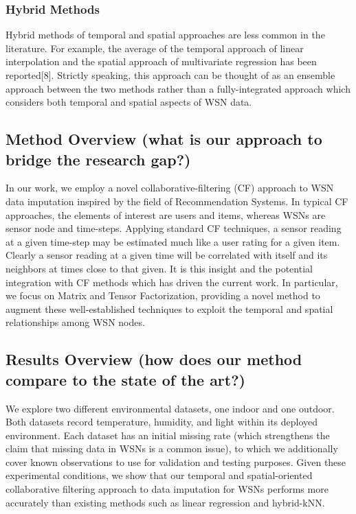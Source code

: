 \subsubsection{Hybrid Methods}
Hybrid methods of temporal and spatial approaches are less common in the literature.
For example, the average of the temporal approach of linear interpolation and the spatial approach of multivariate regression has been reported[8].
Strictly speaking, this approach can be thought of as an ensemble approach between the two methods rather than a fully-integrated approach which considers both temporal and spatial aspects of WSN data.


\subsection{Method Overview (what is our approach to bridge the research gap?)}
In our work, we employ a novel collaborative-filtering (CF) approach to WSN data imputation inspired by the field of Recommendation Systems.
In typical CF approaches, the elements of interest are users and items, whereas WSNs are sensor node and time-steps.
Applying standard CF techniques, a sensor reading at a given time-step may be estimated much like a user rating for a given item.
Clearly a sensor reading at a given time will be correlated with itself and its neighbors at times close to that given.
It is this insight and the potential integration with CF methods which has driven the current work.
In particular, we focus on Matrix and Tensor Factorization, providing a novel method to augment these well-established techniques to exploit the temporal and spatial relationships among WSN nodes.

\subsection{Results Overview (how does our method compare to the state of the art?)}
We explore two different environmental datasets, one indoor and one outdoor.
Both datasets record temperature, humidity, and light within its deployed environment.
Each dataset has an initial missing rate (which strengthens the claim that missing data in WSNs is a common issue), to which we additionally cover known observations to use for validation and testing purposes.
Given these experimental conditions, we show that our temporal and spatial-oriented collaborative filtering approach to data imputation for WSNs performs more accurately than existing methods such as linear regression and hybrid-kNN.

